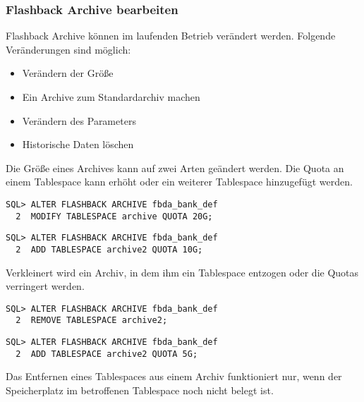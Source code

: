         \subsubsection{Flashback Archive bearbeiten}
          Flashback Archive können im laufenden Betrieb verändert werden. Folgende Veränderungen sind möglich:
          \begin{itemize}
            \item Verändern der Größe
            \item Ein Archive zum Standardarchiv machen
            \item Verändern des Parameters 
            \item Historische Daten löschen
          \end{itemize}
          Die Größe eines Archives kann auf zwei Arten geändert werden. Die Quota an einem Tablespace kann erhöht oder ein weiterer Tablespace hinzugefügt werden.
          \begin{lstlisting}[caption={Die Quota eines Archives auf 20GB erhöhen},label=admin1734,language=oracle_sql]
SQL> ALTER FLASHBACK ARCHIVE fbda_bank_def
  2  MODIFY TABLESPACE archive QUOTA 20G;
          \end{lstlisting}
          \begin{lstlisting}[caption={Dem Archiv einen weiteren Tablespace hinzufügen},label=admin1735,language=oracle_sql]
SQL> ALTER FLASHBACK ARCHIVE fbda_bank_def
  2  ADD TABLESPACE archive2 QUOTA 10G;
          \end{lstlisting}
          Verkleinert wird ein Archiv, in dem ihm ein Tablespace entzogen oder die Quotas verringert werden.
          \begin{lstlisting}[caption={Einen Tablespace aus dem Archiv entfernen},label=admin1736,language=oracle_sql]
SQL> ALTER FLASHBACK ARCHIVE fbda_bank_def
  2  REMOVE TABLESPACE archive2;
          \end{lstlisting}
          \begin{lstlisting}[caption={Die Quota eines Tablespaces verringern},label=admin1737,language=oracle_sql]
SQL> ALTER FLASHBACK ARCHIVE fbda_bank_def
  2  ADD TABLESPACE archive2 QUOTA 5G;
          \end{lstlisting}
          \begin{merke}
            Das Entfernen eines Tablespaces aus einem Archiv funktioniert nur, wenn der Speicherplatz im betroffenen Tablespace noch nicht belegt ist.
          \end{merke}
